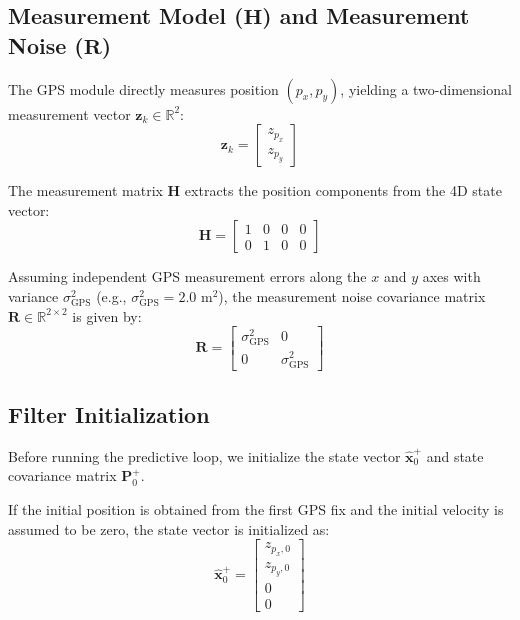 \documentclass{article}
\begin{document}
	
	\subsection{Measurement Model ($\mathbf{H}$) and Measurement Noise ($\mathbf{R}$)}
	
	The GPS module directly measures position $(p_x, p_y)$, yielding a two-dimensional measurement vector $\mathbf{z}_k \in \mathbb{R}^2$:
	\begin{equation}
		\mathbf{z}_k = 
		\begin{bmatrix}
			z_{p_x} \\
			z_{p_y}
		\end{bmatrix}
	\end{equation}
	
	The measurement matrix $\mathbf{H}$ extracts the position components from the 4D state vector:
	\begin{equation}
		\mathbf{H} = 
		\begin{bmatrix}
			1 & 0 & 0 & 0 \\
			0 & 1 & 0 & 0
		\end{bmatrix}
	\end{equation}
	
	Assuming independent GPS measurement errors along the $x$ and $y$ axes with variance $\sigma_{\text{GPS}}^2$ (e.g., $\sigma_{\text{GPS}}^2 = 2.0 \text{ m}^2$), the measurement noise covariance matrix $\mathbf{R} \in \mathbb{R}^{2 \times 2}$ is given by:
	\begin{equation}
		\mathbf{R} = 
		\begin{bmatrix}
			\sigma_{\text{GPS}}^2 & 0 \\
			0 & \sigma_{\text{GPS}}^2
		\end{bmatrix}
	\end{equation}
	
	\subsection{Filter Initialization}
	
	Before running the predictive loop, we initialize the state vector $\hat{\mathbf{x}}_0^+$ and state covariance matrix $\mathbf{P}_0^+$. 
	
	If the initial position is obtained from the first GPS fix and the initial velocity is assumed to be zero, the state vector is initialized as:
	\begin{equation}
		\hat{\mathbf{x}}_0^+ = 
		\begin{bmatrix}
			z_{p_x, 0} \\
			z_{p_y, 0} \\
			0 \\
			0
		\end{bmatrix}
	\end{equation}
	
\end{document}
